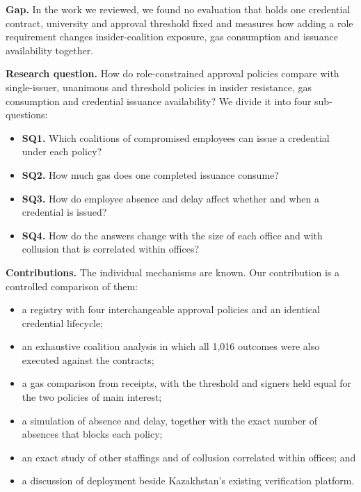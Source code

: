 \textbf{Gap.} In the work we reviewed, we found no evaluation that holds one credential contract, university and approval threshold fixed and measures how adding a role requirement changes insider-coalition exposure, gas consumption and issuance availability together.

\textbf{Research question.} How do role-constrained approval policies compare with single-issuer, unanimous and threshold policies in insider resistance, gas consumption and credential issuance availability? We divide it into four sub-questions:
\begin{itemize}
\item \textbf{SQ1.} Which coalitions of compromised employees can issue a credential under each policy?
\item \textbf{SQ2.} How much gas does one completed issuance consume?
\item \textbf{SQ3.} How do employee absence and delay affect whether and when a credential is issued?
\item \textbf{SQ4.} How do the answers change with the size of each office and with collusion that is correlated within offices?
\end{itemize}

\textbf{Contributions.} The individual mechanisms are known. Our contribution is a controlled comparison of them:
\begin{itemize}
\item a registry with four interchangeable approval policies and an identical credential lifecycle;
\item an exhaustive coalition analysis in which all 1,016 outcomes were also executed against the contracts;
\item a gas comparison from receipts, with the threshold and signers held equal for the two policies of main interest;
\item a simulation of absence and delay, together with the exact number of absences that blocks each policy;
\item an exact study of other staffings and of collusion correlated within offices; and
\item a discussion of deployment beside Kazakhstan's existing verification platform.
\end{itemize}
